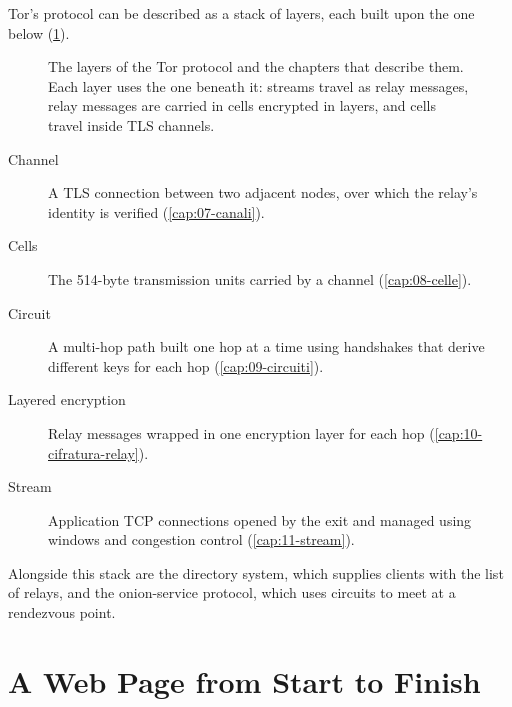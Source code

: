 Tor's protocol can be described as a stack of layers, each built upon the one below (\cref{fig:arch-livelli}).

\begin{figure}[htbp]
\centering

\caption{The layers of the Tor protocol and the chapters that describe them. Each layer uses the one beneath it: streams travel as relay messages, relay messages are carried in cells encrypted in layers, and cells travel inside TLS channels.}
\label{fig:arch-livelli}
\end{figure}

\begin{description}
  \item[Channel] A TLS connection between two adjacent nodes, over which the relay's identity is verified (\cref{cap:07-canali}).
  \item[Cells] The 514-byte transmission units carried by a channel (\cref{cap:08-celle}).
  \item[Circuit] A multi-hop path built one hop at a time using handshakes that derive different keys for each hop (\cref{cap:09-circuiti}).
  \item[Layered encryption] Relay messages wrapped in one encryption layer for each hop (\cref{cap:10-cifratura-relay}).
  \item[Stream] Application TCP connections opened by the exit and managed using windows and congestion control (\cref{cap:11-stream}).
\end{description}
Alongside this stack are the directory system, which supplies clients with the list of relays, and the onion-service protocol, which uses circuits to meet at a rendezvous point.

\section{A Web Page from Start to Finish}\label{sec:arch-percorso}

